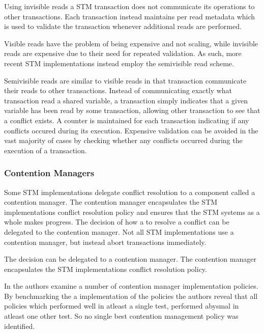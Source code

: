 Using invisible reads a \ac{STM} transaction does not communicate its operations to other transactions\cite[p. 114]{imbs2012virtual}. Each transaction instead maintains per read metadata which is used to validate the transaction whenever additional reads are performed\cite[p. 2085]{herlihy2011tm}.

Visible reads have the problem of being expensive and not scaling, while invisible reads are expensive due to their need for repeated validation. As such, more recent \ac{STM} implementations instead employ the semivisible read scheme\cite[p. 2085]{herlihy2011tm}.

Semivisible reads are similar to visible reads in that transaction communicate their reads to other transactions. Instead of communicating exactly what transaction read a shared variable, a transaction simply indicates that a given variable has been read by some transaction, allowing other transaction to see that a conflict exists. A counter is maintained for each transaction indicating if any conflicts occured during its execution. Expensive validation can be avoided in the vast majority of cases by checking whether any conflicts occurred during the execution of a transaction\cite[p. 2]{lev2009anatomy}.

\subsubsection{Contention Managers}
\label{subsub:con_managers}
Some \ac{STM} implementations delegate conflict resolution to a component called a contention manager\cite[p. 2085]{herlihy2011tm}. The contention manager encapsulates the \ac{STM} implementations conflict resolution policy\cite[p. 2085]{herlihy2011tm} and ensures that the \ac{STM} systems as a whole makes progress\cite[p. 1]{guerraoui2005toward}. The decision of how a to resolve a conflict can be delegated to the contention manager. Not all \ac{STM} implementations use a contention manager, but instead abort transactions immediately\cite[38]{riegel2013software}.

The decision can be delegated to a contention manager. The contention manager encapsulates the \ac{STM} implementations conflict resolution policy\cite[p. 2085]{herlihy2011tm}.

In \cite{scherer2004contention} the authors examine a number of contention manager implementation policies. By benchmarking the a implementation of the policies the authors reveal that all policies which performed well in atleast a single test, performed abysmal in atleast one other test. So no single best contention management policy was identified.

